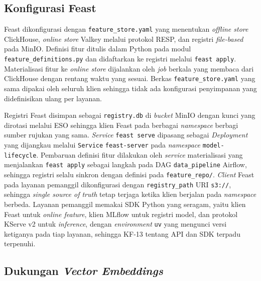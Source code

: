 \subsection{Konfigurasi Feast}
\label{subsec:impl-feast-config}

Feast \autocite{feast2024} dikonfigurasi dengan \texttt{feature\_store.yaml} yang menentukan \textit{offline store} ClickHouse, \textit{online store} Valkey \autocite{valkey2025} melalui protokol RESP, dan registri \textit{file-based} pada MinIO. Definisi fitur ditulis dalam Python pada modul \texttt{feature\_definitions.py} dan didaftarkan ke registri melalui \texttt{feast apply}. Materialisasi fitur ke \textit{online store} dijalankan oleh \textit{job} berkala yang membaca dari ClickHouse dengan rentang waktu yang sesuai. Berkas \texttt{feature\_store.yaml} yang sama dipakai oleh seluruh klien sehingga tidak ada konfigurasi penyimpanan yang didefinisikan ulang per layanan.

Registri Feast disimpan sebagai \texttt{registry.db} di \textit{bucket} MinIO dengan kunci yang dirotasi melalui ESO sehingga klien Feast pada berbagai \textit{namespace} berbagi sumber rujukan yang sama. \textit{Service} \texttt{feast serve} dipasang sebagai \textit{Deployment} yang dijangkau melalui \texttt{Service} \texttt{feast-server} pada \textit{namespace} \texttt{model-lifecycle}. Pembaruan definisi fitur dilakukan oleh \textit{service} materialisasi yang menjalankan \texttt{feast apply} sebagai langkah pada DAG \texttt{data\_pipeline} Airflow, sehingga registri selalu sinkron dengan definisi pada \texttt{feature\_repo/}. \textit{Client} Feast pada layanan pemanggil dikonfigurasi dengan \texttt{registry\_path} URI \texttt{s3://}, sehingga \textit{single source of truth} tetap terjaga ketika klien berjalan pada \textit{namespace} berbeda. Layanan pemanggil memakai SDK Python yang seragam, yaitu klien Feast untuk \textit{online feature}, klien MLflow untuk registri model, dan protokol KServe v2 untuk \textit{inference}, dengan \textit{environment} \texttt{uv} yang mengunci versi ketiganya pada tiap layanan, sehingga KF-13 tentang API dan SDK terpadu terpenuhi.

\subsection{Dukungan \textit{Vector Embeddings}}
\label{subsec:impl-vektor}

